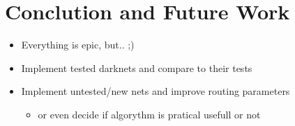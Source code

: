 \chapter{Conclution and Future Work}

\begin{itemize}
\item    Everything is epic, but.. ;)
\item    Implement tested darknets and compare to their tests
\item    Implement untested/new nets and improve routing parameters
\begin{itemize} \item        or even decide if algorythm is pratical usefull or not \end{itemize}
\end{itemize}

